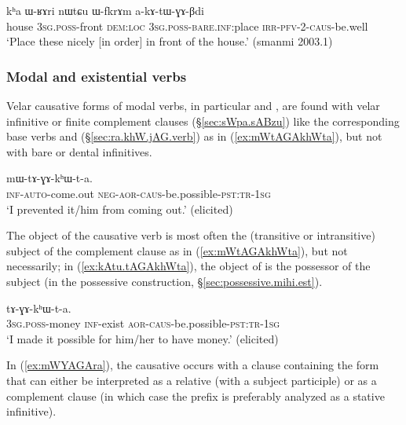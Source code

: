 \begin{exe}
\ex \label{ex:akAtWGABdi}
\gll  kʰa ɯ-ʁɤri nɯtɕu ɯ-fkrɤm a-kɤ-tɯ-ɣɤ-βdi \\
house \textsc{3sg}.\textsc{poss}-front \textsc{dem}:\textsc{loc} \textsc{3sg}.\textsc{poss}-\textsc{bare}.\textsc{inf}:place \textsc{irr}-\textsc{pfv}-2-\textsc{caus}-be.well \\
\glt `Place these nicely [in order] in front of the house.' (smanmi 2003.1)
\end{exe}

\subsubsection{Modal and existential verbs} \label{sec:velar.caus.modal}
Velar causative forms of modal verbs, in particular  and  , are found with velar infinitive or finite complement clauses (§\ref{sec:sWpa.sABzu}) like the corresponding base verbs  and  (§\ref{sec:ra.khW.jAG.verb}) as in (\ref{ex:mWtAGAkhWta}), but not with bare or dental infinitives.

\begin{exe}
\ex \label{ex:mWtAGAkhWta}
\gll  [kɤ-nɯ-ɬoʁ] mɯ-tɤ-ɣɤ-kʰɯ-t-a. \\
  \textsc{inf}-\textsc{auto}-come.out \textsc{neg}-\textsc{aor}-\textsc{caus}-be.possible-\textsc{pst}:\textsc{tr}-\textsc{1sg} \\
\glt `I prevented it/him from coming out.' (elicited)
\end{exe}

The object of the causative verb is most often the (transitive or intransitive) subject of the complement clause as in (\ref{ex:mWtAGAkhWta}), but not necessarily; in (\ref{ex:kAtu.tAGAkhWta}), the object of  is the possessor of the subject (in the possessive construction, §\ref{sec:possessive.mihi.est}).

\begin{exe}
\ex \label{ex:kAtu.tAGAkhWta}
\gll [ɯ-rŋɯl kɤ-tu] tɤ-ɣɤ-kʰɯ-t-a. \\
\textsc{3sg}.\textsc{poss}-money \textsc{inf}-exist \textsc{aor}-\textsc{caus}-be.possible-\textsc{pst}:\textsc{tr}-\textsc{1sg} \\
\glt `I made it possible for him/her to have money.'  (elicited)
\end{exe}

In (\ref{ex:mWYAGAra}), the causative  occurs with a clause containing the form  that can either be interpreted as a relative (with a subject participle) or as a complement clause (in which case the  prefix is preferably analyzed as a stative infinitive).

